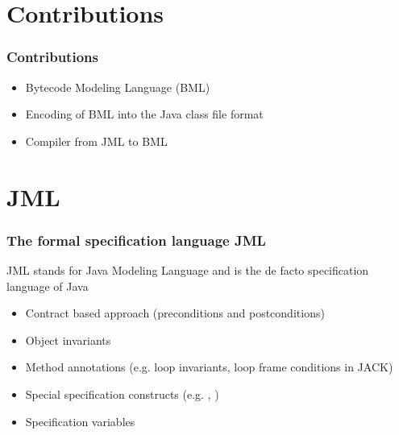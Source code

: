 \documentclass[c]{beamer}
\begin{document}
\section{Contributions}
\begin{frame}\frametitle{Contributions}
 \begin{itemize}
   \item Bytecode Modeling Language (BML)  
   \item Encoding of BML into the Java class file format
   
   \item Compiler from JML to BML
\end{itemize}
\end{frame}

\section{JML}

\begin{frame}\frametitle{The formal specification language JML}
 JML stands for  Java Modeling Language and is the de facto specification language of Java
  \begin{itemize}
     \item Contract based approach  (preconditions and postconditions)
     \item Object invariants 
     \item Method annotations  (e.g. loop invariants, loop frame conditions in JACK)  
     \item Special specification constructs (e.g. , \result) 
     \item Specification variables  
  \end{itemize}
\end{frame}
\end{document}

